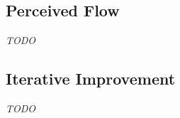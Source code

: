 \subsection{Perceived Flow}

\emph{TODO}

%






\subsection{Iterative Improvement}
\label{sec:iterative-improvement}

\emph{TODO}








\cite[][Rule \#2]{google-ml-rules}
